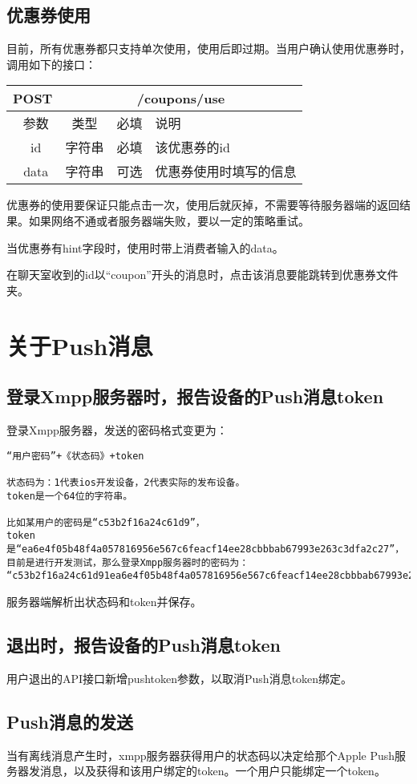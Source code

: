 \subsection{优惠券使用}
目前，所有优惠券都只支持单次使用，使用后即过期。当用户确认使用优惠券时，调用如下的接口：
\begin{table}[H]
   \begin{center}
\begin{tabular}{|c|c|c|p{12cm}|}
\hline
POST & \multicolumn{3}{|c|}{/coupons/use} \\
\hline\hline
 \  参数  & 类型 & 必填 &  说明  \\
\hline
 \  id  & 字符串 & 必填 &  该优惠券的id  \\
 \hline
 \  data  & 字符串 & 可选 &  优惠券使用时填写的信息  \\
\hline
\end{tabular}
   \end{center}
\end{table}

优惠券的使用要保证只能点击一次，使用后就灰掉，不需要等待服务器端的返回结果。如果网络不通或者服务器端失败，要以一定的策略重试。

当优惠券有hint字段时，使用时带上消费者输入的data。


在聊天室收到的id以“coupon”开头的消息时，点击该消息要能跳转到优惠券文件夹。




\section{关于Push消息}

\subsection{登录Xmpp服务器时，报告设备的Push消息token}
登录Xmpp服务器，发送的密码格式变更为：

\begin{verbatim}
“用户密码”+《状态码》+token

状态码为：1代表ios开发设备，2代表实际的发布设备。
token是一个64位的字符串。

比如某用户的密码是“c53b2f16a24c61d9”，
token是“ea6e4f05b48f4a057816956e567c6feacf14ee28cbbbab67993e263c3dfa2c27”，
目前是进行开发测试，那么登录Xmpp服务器时的密码为：
“c53b2f16a24c61d91ea6e4f05b48f4a057816956e567c6feacf14ee28cbbbab67993e263c3dfa2c27”。
\end{verbatim}

服务器端解析出状态码和token并保存。


\subsection{退出时，报告设备的Push消息token}

用户退出的API接口新增pushtoken参数，以取消Push消息token绑定。

\subsection{Push消息的发送}
当有离线消息产生时，xmpp服务器获得用户的状态码以决定给那个Apple Push服务器发消息，以及获得和该用户绑定的token。一个用户只能绑定一个token。
